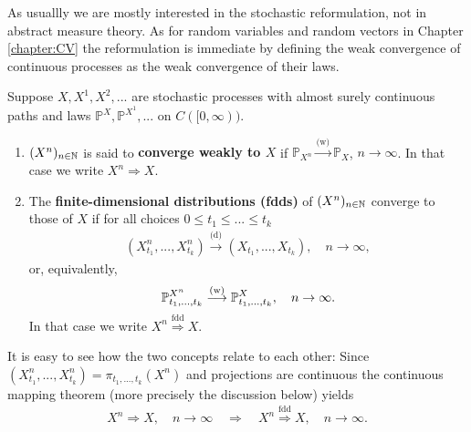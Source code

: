 As usuallly we are mostly interested in the stochastic reformulation, not in abstract measure theory. As for random variables and random vectors in Chapter \ref{chapter:CV} the reformulation is immediate by defining the weak convergence of continuous processes as the weak convergence of their laws.
\begin{ldef}
\begin{deff}\label{def:wk}
	Suppose $X,X^1,X^2,...$ are stochastic processes with almost surely continuous paths and laws $\mathbb{P}^{X},\mathbb{P}^{X^1},...$ on $C([0,\infty))$.
	\begin{enumerate}[label=(\roman*)]
		\item $(X^n)_{n\in\N}$ is said to \textbf{converge weakly to $X$} if $\mathbb{P}_{X^n} \overset{\text{(w)}}{\longrightarrow} \mathbb{P}_X$, $n\to\infty$. In that case we write $X^n \Rightarrow X$.%
		\item The \textbf{finite-dimensional distributions (fdds)} of $(X^n)_{n\in\N}$ converge to those of $X$ if for all choices $0 \leq t_1 \leq ... \leq t_k$
		\begin{align*}
			\left( X_{t_1}^n,...,X_{t_k}^n \right) \overset{\text{(d)}}{\longrightarrow} \left( X_{t_1},...,X_{t_k}\right), \quad n\to\infty,
		\end{align*}
		or, equivalently,
		\begin{align}
			\P^{X^n}_{t_1,...,t_k}\overset{\text{(w)}}{\longrightarrow} \P^X_{t_1,...,t_k},\quad n\to\infty.
		\end{align}
		In that case we write $X^n \overset{\text{fdd}}{\Longrightarrow}X$.
	\end{enumerate}
\end{deff}
\end{ldef}
It is easy to see how the two concepts relate to each other: Since $(X_{t_1}^n,...,X_{t_k}^n) = \pi_{t_1,...,t_k}(X^n)$ and projections are continuous the continuous mapping theorem (more precisely the discussion below) yields
	\begin{align*}
		X^n \Rightarrow X,\quad n\to\infty\quad  \Longrightarrow \quad X^n \overset{\text{fdd}}{\Longrightarrow}X,\quad n\to\infty.
	\end{align*}
